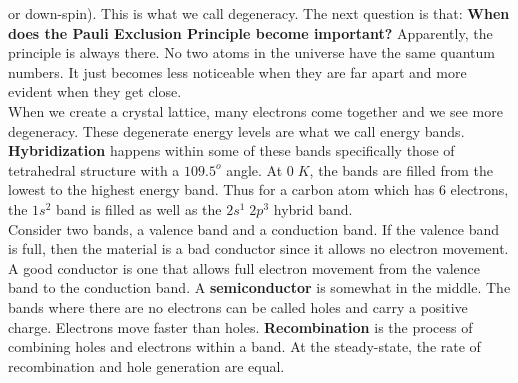 \documentclass{article}
\begin{document}
or down-spin). This is what we call degeneracy.
\newpage 
\noindent 
The next question is that: \textbf{When does the Pauli Exclusion Principle become 
important?} Apparently, the principle is always there. No two atoms in the universe have 
the same quantum numbers. It just becomes less noticeable when they are far apart and
more evident when they get close. 
\vspace{8pt}
\\ When we create a crystal lattice, many electrons come together and we see more 
degeneracy. These degenerate energy levels are what we call energy bands. 
\textbf{Hybridization} happens within some of these bands specifically those of 
tetrahedral structure with a $109.5^{o}$ angle. At $0\;K$, the bands are filled from  
the lowest to the highest energy band. Thus for a carbon atom which has 6 electrons,
the $1s^2$ band is filled as well as the $2s^{1}\; 2p^{3}$ hybrid band. 
\vspace{8pt}
\\ Consider two bands, a valence band and a conduction band. If the valence band is full,
then the material is a bad conductor since it allows no electron movement. A good conductor 
is one that allows full electron movement from the valence band to the conduction band.
A \textbf{semiconductor} is somewhat in the middle. The bands where there are no 
electrons can be called holes and carry a positive charge. Electrons move faster than
holes. \textbf{Recombination} is the process of combining holes and electrons within
a band. At the steady-state, the rate of recombination and hole generation are equal.
\end{document}
